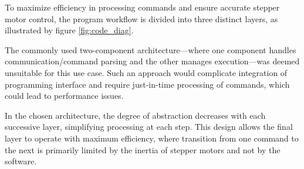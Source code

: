 
To maximize efficiency in processing commands and ensure accurate stepper motor control, the program workflow is divided into three distinct layers, as illustrated by figure \ref{fig:code_diag}.

The commonly used two-component architecture—where one component handles communication/command parsing and the other manages execution—was deemed unsuitable for this use case.
Such an approach would complicate integration of programming interface and require just-in-time processing of commands, which could lead to performance issues.

In the chosen architecture, the degree of abstraction decreases with each successive layer, simplifying processing at each step.
This design allows the final layer to operate with maximum efficiency, where transition from one command to the next is primarily limited by the inertia of stepper motors and not by the software.

